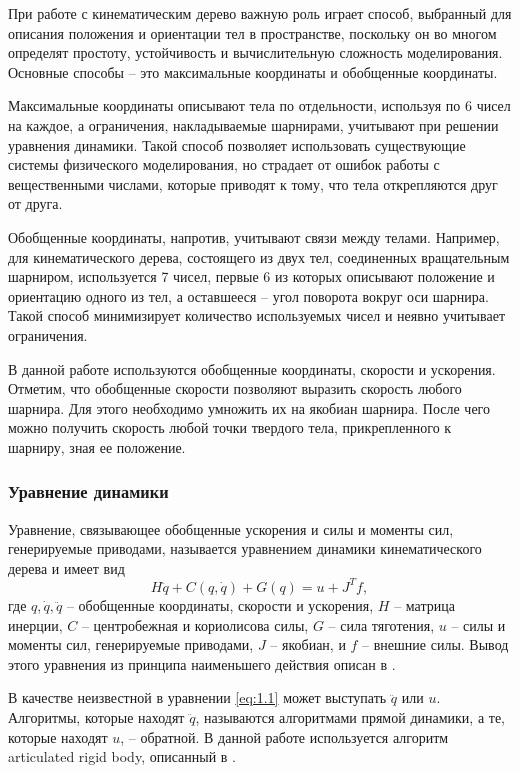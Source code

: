 При работе с кинематическим дерево важную роль играет способ, выбранный для описания положения и ориентации тел в пространстве, поскольку он во многом определят простоту, устойчивость и вычислительную сложность моделирования. Основные способы -- это максимальные координаты и обобщенные координаты.

Максимальные координаты описывают тела по отдельности, используя по 6 чисел на каждое, а ограничения, накладываемые шарнирами, учитывают при решении уравнения динамики. Такой способ позволяет использовать существующие системы физического моделирования, но страдает от ошибок работы с вещественными числами, которые приводят к тому, что тела открепляются друг от друга.

Обобщенные координаты, напротив, учитывают связи между телами. Например, для кинематического дерева, состоящего из двух тел, соединенных вращательным шарниром, используется 7 чисел, первые 6 из которых описывают положение и ориентацию одного из тел, а оставшееся -- угол поворота вокруг оси шарнира. Такой способ минимизирует количество используемых чисел и неявно учитывает ограничения.

В данной работе используются обобщенные координаты, скорости и ускорения. Отметим, что обобщенные скорости позволяют выразить скорость любого шарнира. Для этого необходимо умножить их на якобиан шарнира. После чего можно получить скорость любой точки твердого тела, прикрепленного к шарниру, зная ее положение.

\subsubsection{Уравнение динамики}

Уравнение, связывающее обобщенные ускорения и силы и моменты сил, генерируемые приводами, называется уравнением динамики кинематического дерева и имеет вид
\begin{equation*}
  H \ddot{q} + C(q, \dot{q}) + G(q) = u + J^{T} f, \tag{1.1}\label{eq:1.1}
\end{equation*}
где $q, \dot{q}, \ddot{q}$ -- обобщенные координаты, скорости и ускорения, $H$ -- матрица инерции, $C$ -- центробежная и кориолисова силы, $G$ -- сила тяготения, $u$ -- силы и моменты сил, генерируемые приводами, $J$ -- якобиан, и $f$ -- внешние силы. Вывод этого уравнения из принципа наименьшего действия описан в \cite{Featherstone}.

В качестве неизвестной в уравнении \ref{eq:1.1} может выступать $\ddot{q}$ или $u$. Алгоритмы, которые находят $\ddot{q}$, называются алгоритмами прямой динамики, а те, которые находят $u$, -- обратной. В данной работе используется алгоритм articulated rigid body, описанный в \cite{Featherstone}.

